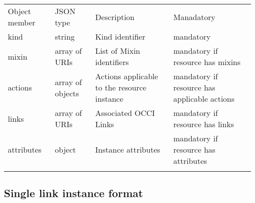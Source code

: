\documentclass[10pt,a4paper]{article}
\begin{document}
 {
    \begin{tabular}{llp{5.0cm}p{3.0cm}}
    \toprule
    Object member & JSON type & Description & Manadatory \\
    \colrule
    kind & string & Kind identifier & mandatory \\

    mixin & array of URIs & List of Mixin identifiers &
    mandatory if resource has mixins \\

    actions & array of objects & Actions applicable to the resource instance &
    mandatory if resource has applicable actions \\

    links & array of URIs & Associated OCCI Links &
    mandatory if resource has links\\

    attributes & object & Instance attributes & mandatory if resource has attributes \\
    \botrule
    \end{tabular}
}

\subsection{Single link instance format}
\label{sec:format_link}
\end{document}
